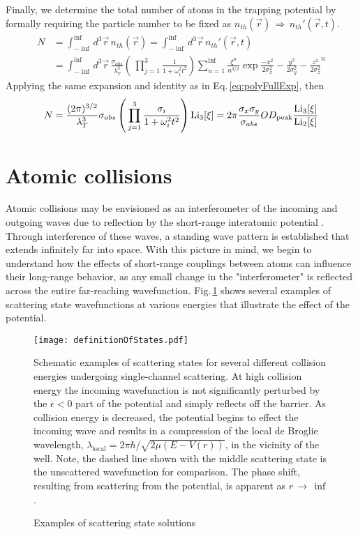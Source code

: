 Finally, we determine the total number of atoms in the trapping potential by formally requiring the particle number to be fixed as $n_{th}(\vec{r})\,\Rightarrow\,n_{th}'(\vec{r},t)$.
\begin{equation}
\begin{split}
	N&=\int_{-\inf}^{\inf} d^3\vec{r}\, n_{th}(\vec{r}) = \int_{-\inf}^{\inf} d^3\vec{r}\, n_{th}'(\vec{r},t) \\
&=\int_{-\inf}^{\inf} d^3\vec{r}\, \frac{\sigma_{abs}}{\lambda_T^3} \left( \, \prod_{j=1}^3 \frac{1}{1+\omega_i^2t^2}\right) \sum_{n=1}^{\inf} \frac{\xi^n}{n^{3/2}} \exp{\frac{-x^2}{2\sigma_x^2} - \frac{y^2}{2\sigma_y^2} - \frac{z^2}{2\sigma_z^2}}^n
\end{split}
\end{equation}
Applying the same expansion and identity as in Eq.\,\ref{eq:polyFullExp}, then
\begin{equation}
	N=\frac{(2\pi)^{3/2}}{\lambda_T^3}  \sigma_{abs} \left( \, \prod_{j=1}^3 \frac{\sigma_i}{1+\omega_i^2t^2}\right) \text{Li}_{3}\!\left[ \xi \right] 
	= 2\pi \frac{\sigma_x \sigma_y}{\sigma_{abs}} OD_{\text{peak}}\frac{\text{Li}_{3}\!\left[ \xi \right]}{\text{Li}_{2}\!\left[ \xi \right]}
\end{equation}

\section{Atomic collisions} \label{sec:cold_collisions}
Atomic collisions may be envisioned as an interferometer of the incoming and outgoing waves due to reflection by the short-range interatomic potential \cite{Jones2006}.
Through interference of these waves, a standing wave pattern is established that extends infinitely far into space.
With this picture in mind, we begin to understand how the effects of short-range couplings between atoms can influence their long-range behavior, as any small change in the "interferometer" is reflected across the entire far-reaching wavefunction.
Fig.\,\ref{fig:3collwf} shows several examples of scattering state wavefunctions at various energies that illustrate the effect of the potential.
\begin{figure} 
	\centerline{
	\texttt{[image: definitionOfStates.pdf]}}
	\caption{Examples of scattering state solutions}{Schematic examples of scattering states for several different collision energies undergoing single-channel scattering. At high collision energy the incoming wavefunction is not significantly perturbed by the $\epsilon<0$ part of the potential and simply reflects off the barrier. As collision energy is decreased, the potential begins to effect the incoming wave and results in a compression of the local de Broglie wavelength, $\lambda_{\text{local}} = 2\pi\hbar/\sqrt{2\mu(E-V(r))}$, in the vicinity of the well. Note, the dashed line shown with the middle scattering state is the unscattered wavefunction for comparison. The phase shift, resulting from scattering from the potential, is apparent as $r\,\rightarrow\,\inf$.}
	\label{fig:3collwf}
\end{figure} 

